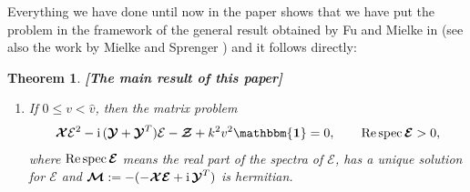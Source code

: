 \documentclass[10pt]{article}
\newcommand{\id}{{\mathbf{\mathbbm{1}}}}
\newtheorem{theorem}{Theorem}[section]
\begin{document}
 
 Everything we have done until now in the paper  {shows} that we have put the problem in the framework of   the general result obtained by  Fu and Mielke in \cite{fu2001nonlinear,fu2002new} (see also the work by Mielke  and Sprenger \cite{mielke1998quasiconvexity}) and it follows  {directly}:
 \begin{theorem}{\rm {\bf [The main result of this paper]}}\label{fmth} 
 	\begin{enumerate}
 		\item 	If $0\leq v<\widehat{v}$, then the matrix problem 
 		\begin{align}\label{13}
 			\boldsymbol{\mathcal{X}}{\mathcal{E}}^2- {\rm i}\, (  \boldsymbol{\mathcal{Y}}+   \boldsymbol{\mathcal{Y}}^T)\mathcal{E}-  \boldsymbol {\mathcal{Z}}+ k^2 v^2{\id}=0,\qquad \textrm{\rm Re\,spec\,}  \boldsymbol{\mathcal{E}}>0,
 		\end{align}
 		where $\textrm{\rm Re\,spec\,}  \boldsymbol{\mathcal{E}} $  means the real part of the  spectra of $  \boldsymbol{\mathcal{E}}$,  has a unique solution for $  \boldsymbol{\mathcal{E}}$ and $  {  \boldsymbol{\mathcal{M}}}:=-(-	\boldsymbol{\mathcal{X}}  \boldsymbol{\mathcal{E}}+ {\rm i}\,  \boldsymbol{\mathcal{Y}}^T)$ is hermitian.
 		
 		
 		
 		
 		

\end{enumerate}
\end{theorem}
\end{document}
